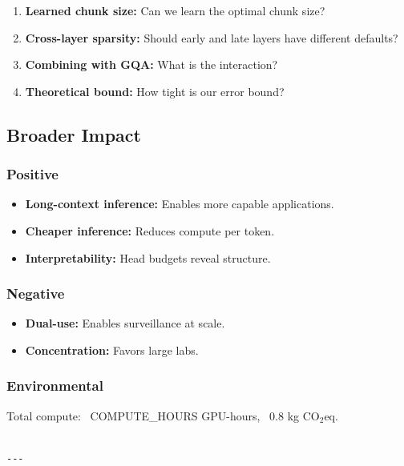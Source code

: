 \begin{enumerate}
\item \textbf{Learned chunk size:} Can we learn the optimal chunk size?
\item \textbf{Cross-layer sparsity:} Should early and late layers have different
  defaults?
\item \textbf{Combining with GQA:} What is the interaction?
\item \textbf{Theoretical bound:} How tight is our error bound?

\end{enumerate}
\subsection{Broader Impact}

\subsubsection{Positive}
\begin{itemize}
\item \textbf{Long-context inference:} Enables more capable applications.
\item \textbf{Cheaper inference:} Reduces compute per token.
\item \textbf{Interpretability:} Head budgets reveal structure.

\end{itemize}
\subsubsection{Negative}
\begin{itemize}
\item \textbf{Dual-use:} Enables surveillance at scale.
\item \textbf{Concentration:} Favors large labs.

\end{itemize}
\subsubsection{Environmental}
Total compute: ~{{COMPUTE\_HOURS}} GPU-hours, ~0.8 kg CO$_2$eq.
\begin{lstlisting}

---
\end{lstlisting}